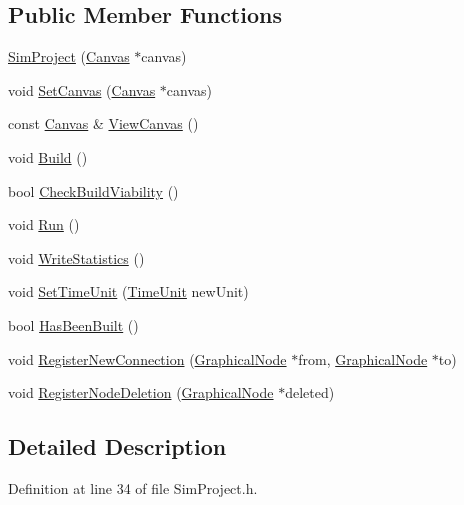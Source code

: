 \subsection*{Public Member Functions}
\begin{DoxyCompactItemize}
\item 
\hyperlink{class_sim_project_a970fe219d4659b02bf5e870a69351399}{Sim\+Project} (\hyperlink{class_canvas}{Canvas} $\ast$canvas)
\item 
void \hyperlink{class_sim_project_aa0e8fbbc7a2307501e31601ac6e9d967}{Set\+Canvas} (\hyperlink{class_canvas}{Canvas} $\ast$canvas)
\item 
const \hyperlink{class_canvas}{Canvas} \& \hyperlink{class_sim_project_ac37baac3398294b75d77892397871cc9}{View\+Canvas} ()
\item 
void \hyperlink{class_sim_project_afefd1eb6d63ea4e0c698084d51a29fcd}{Build} ()
\item 
bool \hyperlink{class_sim_project_af638b9bd89328caf5c24f1189abe714b}{Check\+Build\+Viability} ()
\item 
void \hyperlink{class_sim_project_a955725a364c7a26c2991a0013976fc73}{Run} ()
\item 
void \hyperlink{class_sim_project_a1d85585bc3e52f1dc389612abc0f449e}{Write\+Statistics} ()
\item 
void \hyperlink{class_sim_project_aa54bb0c929580649657d667f4c19646c}{Set\+Time\+Unit} (\hyperlink{_simulation_executive_8h_add9fe45e09605eee3e4a39c8a5c4476d}{Time\+Unit} new\+Unit)
\item 
bool \hyperlink{class_sim_project_a10cc29463f55112602d57f763cbea558}{Has\+Been\+Built} ()
\item 
void \hyperlink{class_sim_project_a37b86538831e7d1e814971c70dce1a54}{Register\+New\+Connection} (\hyperlink{class_graphical_node}{Graphical\+Node} $\ast$from, \hyperlink{class_graphical_node}{Graphical\+Node} $\ast$to)
\item 
void \hyperlink{class_sim_project_ab35e169ce5201aeaa7a251a0d043d7f6}{Register\+Node\+Deletion} (\hyperlink{class_graphical_node}{Graphical\+Node} $\ast$deleted)
\end{DoxyCompactItemize}


\subsection{Detailed Description}


Definition at line 34 of file Sim\+Project.\+h.



